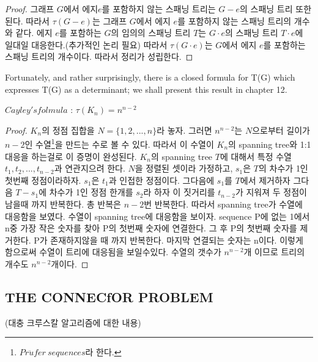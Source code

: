 \begin{proof}
    그래프 $G$에서 에지$e$를 포함하지 않는 스패닝 트리는 $G-e$의 스패닝 트리 또한 된다.
    따라서 $\tau(G-e)$는 그래프 $G$에서 에지 $e$를 포함하지 않는 스패닝 트리의 개수와 같다.
    에지 $e$를 포함하는 $G$의 임의의 스패닝 트리 $T$는 $G \cdot e$의 스패닝 트리 $T \cdot e$에 일대일 대응한다.(추가적인 논리 필요) 따라서 $\tau(G \cdot e)$는 $G$에서 에지 $e$를 포함하는 스패닝 트리의 개수이다. 따라서 정리가 성립한다.
\end{proof}


Fortunately, and rather surprisingly, there is a closed formula for T(G) which expresses T(G) as a determinant; 
we shall present this result in chapter 12.


\begin{theorem}
    $Cayley's folmula$ : $\tau(K_n)= n^{n-2}$
\end{theorem}

\begin{proof}
    $K_n$의 정점 집합을 $N = \{1,2, ...,n\}$라 놓자.
    그러면 $n^{n-2}$는  $N$으로부터 길이가 $n-2$인 수열\footnote{$Pr\ddot{u}fer \: sequences$라 한다.}을 만드는 수로 볼 수 있다.
    따라서 이 수열이 $K_n$의 spanning tree와 1:1대응을 하는걸로 이 증명이 완성된다.
    $K_n$의 spanning tree $T$에 대해서 특정 수열 ${t_1, t_2, ... , t_{n-2}}$과 연관지으려 한다.
    $N$을 정렬된 셋이라 가정하고, $s_1$은 $T$의 차수가 1인 첫번째 정점이라하자. $s_1$은 $t_1$과 인접한 정점이다.
    그다음에 $s_1$를 $T$에서 제거하자 그다음 $T-s_1$에 차수가 1인 정점 한개를 $s_2$라 하자 이 짓거리를 $t_{n-2}$가 지워져 두 정점이 남을때 까지 반복한다. 총 반복은 $n-2$번 반복한다. 따라서 spanning tree가 수열에 대응함을 보였다.
    수열이 spanning tree에 대응함을 보이자.
    sequence P에 없는 1에서 n중 가장 작은 숫자를 찾아 P의 첫번째 숫자에 연결한다.
    그 후 P의 첫번째 숫자를 제거한다.
    P가 존재하지않을 때 까지 반복한다. 마지막 연결되는 숫자는 n이다.
    이렇게 함으로써 수열이 트리에 대응됨을 보일수있다.
    수열의 갯수가 $n^{n-2}$개 이므로 트리의 개수도 $n^{n-2}$개이다.
\end{proof}

\subsection{THE CONNECfOR PROBLEM}
(대충 크루스칼 알고리즘에 대한 내용)
